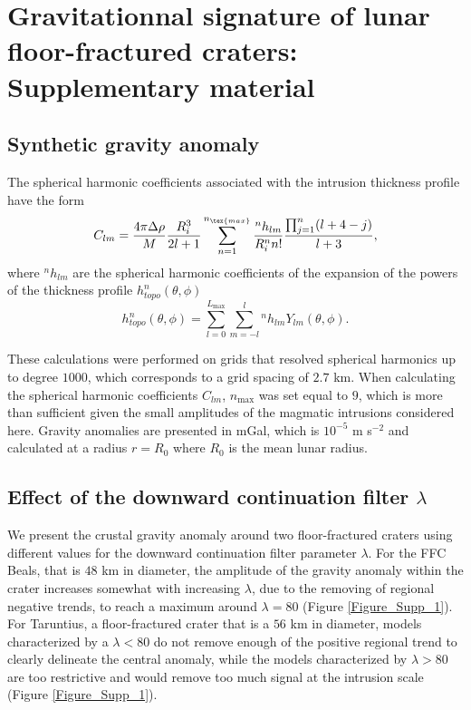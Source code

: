 \chapter[Gravitationnal  signature of  lunar FFCs]{Gravitationnal  signature of  lunar floor-fractured  craters:
  Supplementary material}
\label{C6-chap:A5}


\section{Synthetic gravity anomaly}
\label{sec:synth-grav-anom-1}

The  spherical harmonic  coefficients  associated  with the  intrusion
thickness profile have the form
\begin{equation}
  C_{lm}=\frac{4\pi \Delta \rho}{M}\frac{R_i^3}{2l +1}\sum^{n_{\tex{max}}}_{n=1}\frac{^nh_{lm}}{R_i^n n!}\frac{\prod^n_{j=1}(l+4-j)}{l+3},
\end{equation}
where  $^nh_{lm}$  are  the  spherical harmonic  coefficients  of  the
expansion    of    the    powers     of    the    thickness    profile
$h_{topo}^n(\theta,\phi)$
\begin{equation}
  h^n_{topo}(\theta,\phi)= \sum_{l=0}^{L_{\text{max}}}\sum_{m=-l}^{l}{^n}h_{lm}Y_{lm}(\theta,\phi).
\end{equation}

These  calculations were  performed on  grids that  resolved spherical
harmonics up to degree $1000$, which  corresponds to a grid spacing of
$2.7$  km.   When  calculating  the  spherical  harmonic  coefficients
$C_{lm}$, $n_{\text{max}}$  was set equal  to $9$, which is  more than
sufficient  given  the small  amplitudes  of  the magmatic  intrusions
considered here.  Gravity anomalies  are presented  in mGal,  which is
$10^{-5}$ m s$^{-2}$ and calculated at a radius $r=R_0$ where $R_0$ is
the mean lunar radius.
\section{Effect of the downward continuation filter $\lambda$}
\label{sec:effect-downw-cont}

We  present the  crustal  gravity anomaly  around two  floor-fractured
craters using  different values  for the downward  continuation filter
parameter $\lambda$.  For the FFC Beals,  that is $48$ km in diameter,
the  amplitude of  the  gravity anomaly  within  the crater  increases
somewhat with  increasing $\lambda$, due  to the removing  of regional
negative  trends, to  reach a  maximum around  $\lambda =  80$ (Figure
\ref{Figure_Supp_1}). For Taruntius, a  floor-fractured crater that is
a $56$ km  in diameter, models characterized by a  $\lambda<80$ do not
remove enough of the positive  regional trend to clearly delineate the
central anomaly,  while the  models characterized by  $\lambda>80$ are
too  restrictive and  would remove  too much  signal at  the intrusion
scale (Figure \ref{Figure_Supp_1}).

